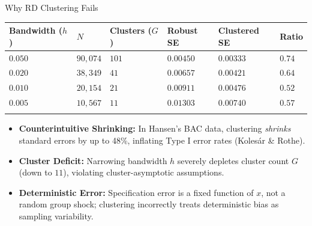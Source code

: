 \documentclass[
  11pt,
  ignorenonframetext,
  aspectratio=169,
]{beamer}
\newcounter{none} %
\providecommand{\tightlist}{%
  \setlength{\itemsep}{0pt}\setlength{\parskip}{0pt}}
\begin{document}
\begin{frame}{Why RD Clustering Fails}
\protect{}\label{why-rd-clustering-fails}
{\def\LTcaptype{none} %
\begin{longtable}[]{@{}
  >{\centering\arraybackslash}p{}
  >{\centering\arraybackslash}p{}
  >{\centering\arraybackslash}p{}
  >{\centering\arraybackslash}p{}
  >{\centering\arraybackslash}p{}
  >{\centering\arraybackslash}p{}@{}}
\toprule\noalign{}
\begin{minipage}[b]{\linewidth}\centering
Bandwidth (\(h\))
\end{minipage} & \begin{minipage}[b]{\linewidth}\centering
\(N\)
\end{minipage} & \begin{minipage}[b]{\linewidth}\centering
Clusters (\(G\))
\end{minipage} & \begin{minipage}[b]{\linewidth}\centering
Robust SE
\end{minipage} & \begin{minipage}[b]{\linewidth}\centering
Clustered SE
\end{minipage} & \begin{minipage}[b]{\linewidth}\centering
Ratio
\end{minipage} \\
\midrule\noalign{}
\endhead
\(0.050\) & \(90{,}074\) & \(101\) & \(0.00450\) & \(0.00333\) &
\(0.74\) \\
\(0.020\) & \(38{,}349\) & \(41\) & \(0.00657\) & \(0.00421\) &
\(0.64\) \\
\(0.010\) & \(20{,}154\) & \(21\) & \(0.00911\) & \(0.00476\) &
\textbf{\(0.52\)} \\
\(0.005\) & \(10{,}567\) & \(11\) & \(0.01303\) & \(0.00740\) &
\(0.57\) \\
\bottomrule\noalign{}
\end{longtable}
}

\begin{itemize}
\tightlist
\item
  \textbf{Counterintuitive Shrinking:} In Hansen's BAC data, clustering
  \emph{shrinks} standard errors by up to 48\%, inflating Type I error
  rates (Kolesár \& Rothe).
\item
  \textbf{Cluster Deficit:} Narrowing bandwidth \(h\) severely depletes
  cluster count \(G\) (down to \(11\)), violating cluster-asymptotic
  assumptions.
\item
  \textbf{Deterministic Error:} Specification error is a fixed function
  of \(x\), not a random group shock; clustering incorrectly treats
  deterministic bias as sampling variability.
\end{itemize}
\end{frame}
\end{document}
